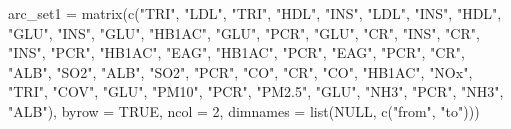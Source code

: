 \documentclass[
  11pt,
  a4paper,
]{article}
\newenvironment{Shaded}{\begin{snugshade}}{\end{snugshade}}
\newcommand{\AttributeTok}[1]{\textcolor[rgb]{0.40,0.45,0.13}{#1}}
\newcommand{\ConstantTok}[1]{\textcolor[rgb]{0.56,0.35,0.01}{#1}}
\newcommand{\DecValTok}[1]{\textcolor[rgb]{0.68,0.00,0.00}{#1}}
\newcommand{\FunctionTok}[1]{\textcolor[rgb]{0.28,0.35,0.67}{#1}}
\newcommand{\NormalTok}[1]{\textcolor[rgb]{0.00,0.23,0.31}{#1}}
\newcommand{\OtherTok}[1]{\textcolor[rgb]{0.00,0.23,0.31}{#1}}
\newcommand{\StringTok}[1]{\textcolor[rgb]{0.13,0.47,0.30}{#1}}
\begin{document}
\begin{Shaded}
\begin{Highlighting}[numbers=left,,]
\NormalTok{arc\_set1 }\OtherTok{=} \FunctionTok{matrix}\NormalTok{(}\FunctionTok{c}\NormalTok{(}\StringTok{"TRI"}\NormalTok{, }\StringTok{"LDL"}\NormalTok{,}
                   \StringTok{"TRI"}\NormalTok{, }\StringTok{"HDL"}\NormalTok{,}
                   \StringTok{"INS"}\NormalTok{, }\StringTok{"LDL"}\NormalTok{,}
                   \StringTok{"INS"}\NormalTok{, }\StringTok{"HDL"}\NormalTok{,}
                   \StringTok{"GLU"}\NormalTok{, }\StringTok{"INS"}\NormalTok{,}
                   \StringTok{"GLU"}\NormalTok{, }\StringTok{"HB1AC"}\NormalTok{,}
                   \StringTok{"GLU"}\NormalTok{, }\StringTok{"PCR"}\NormalTok{,}
                   \StringTok{"GLU"}\NormalTok{, }\StringTok{"CR"}\NormalTok{,}
                   \StringTok{"INS"}\NormalTok{, }\StringTok{"CR"}\NormalTok{,}
                   \StringTok{"INS"}\NormalTok{, }\StringTok{"PCR"}\NormalTok{,}
                   \StringTok{"HB1AC"}\NormalTok{, }\StringTok{"EAG"}\NormalTok{,}
                   \StringTok{"HB1AC"}\NormalTok{, }\StringTok{"PCR"}\NormalTok{,}
                   \StringTok{"EAG"}\NormalTok{, }\StringTok{"PCR"}\NormalTok{,}
                   \StringTok{"CR"}\NormalTok{, }\StringTok{"ALB"}\NormalTok{,}
                   \StringTok{"SO2"}\NormalTok{, }\StringTok{"ALB"}\NormalTok{,}
                   \StringTok{"SO2"}\NormalTok{, }\StringTok{"PCR"}\NormalTok{,}
                   \StringTok{"CO"}\NormalTok{, }\StringTok{"CR"}\NormalTok{,}
                   \StringTok{"CO"}\NormalTok{, }\StringTok{"HB1AC"}\NormalTok{,}
                   \StringTok{"NOx"}\NormalTok{, }\StringTok{"TRI"}\NormalTok{,}
                   \StringTok{"COV"}\NormalTok{, }\StringTok{"GLU"}\NormalTok{,}
                   \StringTok{"PM10"}\NormalTok{, }\StringTok{"PCR"}\NormalTok{,}
                   \StringTok{"PM2.5"}\NormalTok{, }\StringTok{"GLU"}\NormalTok{,}
                   \StringTok{"NH3"}\NormalTok{, }\StringTok{"PCR"}\NormalTok{,}
                   \StringTok{"NH3"}\NormalTok{, }\StringTok{"ALB"}\NormalTok{), }\AttributeTok{byrow =} \ConstantTok{TRUE}\NormalTok{, }\AttributeTok{ncol =} \DecValTok{2}\NormalTok{,}
                 \AttributeTok{dimnames =} \FunctionTok{list}\NormalTok{(}\ConstantTok{NULL}\NormalTok{, }\FunctionTok{c}\NormalTok{(}\StringTok{"from"}\NormalTok{, }\StringTok{"to"}\NormalTok{)))}
\end{Highlighting}
\end{Shaded}
\end{document}
